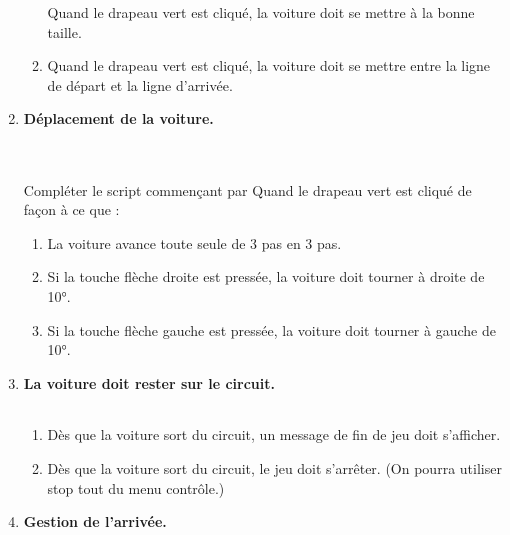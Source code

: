\documentclass[12pt,a4paper]{article} %
\begin{document}
\begin{enumerate}[1{)}]
\begin{enumerate}[a{)}]
Quand le drapeau vert est cliqué, la voiture doit se mettre à la bonne taille.
\item
Quand le drapeau vert est cliqué, la voiture doit se mettre entre la ligne de départ et la ligne d'arrivée.
\end{enumerate} \vspace{6pt}
\item
\textbf{Déplacement de la voiture.} \hfill \renewcommand{\arraystretch}{2}
\begin{tabular}{|p{5mm}|}
\hline
\\
\hline
\end{tabular} \vspace{-6pt} \\
Compléter le script commençant par \og Quand le drapeau vert est cliqué \fg{} de façon à ce que :
\begin{enumerate}[a{)}]
\item
La voiture avance toute seule de 3 pas en 3 pas.
\item
Si la touche \og flèche droite \fg{} est pressée, la voiture doit tourner à droite de 10°.
\item
Si la touche \og flèche gauche \fg{} est pressée, la voiture doit tourner à gauche de 10°.
\end{enumerate} \vspace{6pt}
\item
\textbf{La voiture doit rester sur le circuit.} \hfill \renewcommand{\arraystretch}{2}
\begin{tabular}{|p{5mm}|}
\hline
\\
\hline
\end{tabular} \vspace{-6pt}
\begin{enumerate}[a{)}]
\item
Dès que la voiture sort du circuit, un message de fin de jeu doit s'afficher.
\item
Dès que la voiture sort du circuit, le jeu doit s'arrêter. (On pourra utiliser \og stop tout \fg{} du menu contrôle.)
\end{enumerate} \vspace{6pt}
\item
\textbf{Gestion de l'arrivée.} \hfill \renewcommand{\arraystretch}{2}

\end{enumerate}
\end{document}
